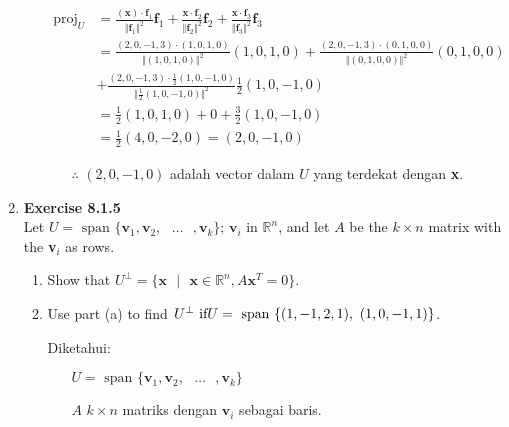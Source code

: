 \documentclass[12pt, a4paper]{scrartcl}
\begin{document}
\begin{enumerate}
\begin{enumerate}
                \begin{align*}
                    \mbox{proj}_U &= \frac{(\textbf{x}) \cdot \textbf{f}_1}{\Vert\textbf{f}_1\Vert^2}\textbf{f}_1 + \frac{\textbf{x} \cdot \textbf{f}_2}{\Vert\textbf{f}_2\Vert^2}\textbf{f}_2 + \frac{\textbf{x} \cdot \textbf{f}_3}{\Vert\textbf{f}_3\Vert^2}\textbf{f}_3
                    \\ &= \frac{(2,0,-1,3) \cdot (1,0,1,0)}{\Vert(1,0,1,0)\Vert^2}(1,0,1,0) + \frac{(2,0,-1,3) \cdot (0,1,0,0)}{\Vert(0,1,0,0)\Vert^2}(0,1,0,0)
                    \\ &+ \frac{(2,0,-1,3) \cdot \frac{1}{2}(1,0,-1,0)}{\Vert\frac{1}{2}(1,0,-1,0)\Vert^2}\frac{1}{2}(1,0,-1,0)
                    \\ &= \frac{1}{2}(1,0,1,0) + 0 + \frac{3}{2}(1,0,-1,0)
                    \\ &= \frac{1}{2}(4,0,-2,0) = (2,0,-1,0)
                \end{align*}
                \begin{itemize}
                    \item[$\therefore$] $(2,0,-1,0)$ adalah vector dalam $U$ yang terdekat dengan \textbf{x}.
                \end{itemize}
            \end{enumerate}
            
            \item \textbf{Exercise 8.1.5}\\Let $U = \mbox{ span } \{\textbf{v}_1, \textbf{v}_2, \mbox{ }\dots\mbox{ }, \textbf{v}_k\} \mbox{; } \textbf{v}_i \mbox{ in } \mathbb{R}^n$, and let $A$ be the $k \times n$ matrix with the \textbf{v}$_i$ as rows.
            \begin{enumerate}
                \item Show that $U^\perp = \{\textbf{x} \mbox{ }|\mbox{ } \textbf{x} \in \mathbb{R}^n, A\textbf{x}^T=0\}$.
                \item Use part (a) to find $U^\perp \mbox{ if}\\U = \mbox{ span } \{(1, -1, 2, 1), \mbox{ }(1, 0, -1, 1)\}$.
                
                Diketahui:
                \begin{itemize}
                    \item[] $U = \mbox{ span } \{\textbf{v}_1, \textbf{v}_2, \mbox{ }\dots\mbox{ }, \textbf{v}_k\}$
                    \item[] $A$ $k \times n$ matriks dengan $\textbf{v}_i$ sebagai baris.
                \end{itemize}


\end{enumerate}
\end{enumerate}
\end{document}
